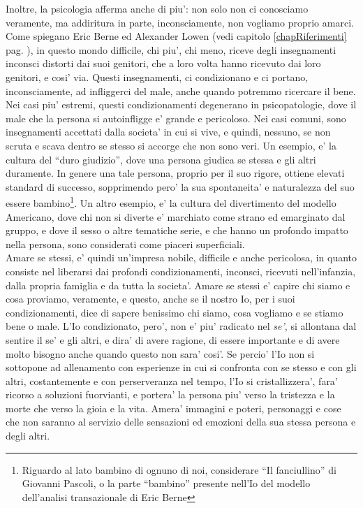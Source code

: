Inoltre, la psicologia afferma anche di piu': non solo non ci conosciamo veramente, ma addiritura in parte, inconsciamente, non vogliamo proprio amarci. Come spiegano Eric Berne ed Alexander Lowen (vedi capitolo \ref{chapRiferimenti} pag. \pageref{chapRiferimenti}), in questo mondo difficile, chi piu', chi meno, riceve degli insegnamenti inconsci distorti dai suoi genitori, che a loro volta hanno ricevuto dai loro genitori, e cosi' via. Questi insegnamenti, ci condizionano e ci portano, inconsciamente, ad infliggerci del male, anche quando potremmo ricercare il bene. Nei casi piu' estremi, questi condizionamenti degenerano in psicopatologie, dove il male che la persona si autoinfligge e' grande e pericoloso. Nei casi comuni, sono insegnamenti accettati dalla societa' in cui si vive, e quindi, nessuno, se non scruta e scava dentro se stesso si accorge che non sono veri. Un esempio, e' la cultura del ``duro giudizio'', dove una persona giudica se stessa e gli altri duramente. In genere una tale persona, proprio per il suo rigore, ottiene elevati standard di successo, sopprimendo pero' la sua spontaneita' e naturalezza del suo essere bambino\footnote{Riguardo al lato bambino di ognuno di noi, considerare ``Il fanciullino'' di Giovanni Pascoli, o la parte ``bambino'' presente nell'Io del modello dell'analisi transazionale di Eric Berne}.  Un altro esempio, e' la cultura del divertimento del modello Americano, dove chi non si diverte e' marchiato come strano ed emarginato dal gruppo, e dove il sesso o altre tematiche serie, e che hanno un profondo impatto nella persona, sono considerati come piaceri superficiali.\\
Amare se stessi, e' quindi un'impresa nobile, difficile e anche pericolosa, in quanto consiste nel liberarsi dai profondi condizionamenti, inconsci, ricevuti nell'infanzia, dalla propria famiglia e da tutta la societa'.
Amare se stessi e' capire chi siamo e cosa proviamo, veramente, e questo, anche se il nostro Io, per i suoi condizionamenti, dice di sapere benissimo chi siamo, cosa vogliamo e se stiamo bene o male.
L'Io condizionato, pero', non e' piu' radicato nel \emph{se'}, si allontana dal sentire il se' e gli altri, e dira' di avere ragione, di essere importante e di avere molto bisogno anche quando questo non sara' cosi'. Se percio' l'Io non si sottopone ad allenamento con esperienze in cui si confronta con se stesso e con gli altri, costantemente e con perserveranza nel tempo, l'Io si cristallizzera', fara' ricorso a soluzioni fuorvianti, e portera' la persona piu' verso la tristezza e la morte che verso la gioia e la vita. Amera' immagini e poteri, personaggi e cose che non saranno al servizio delle sensazioni ed emozioni della sua stessa persona e degli altri.


